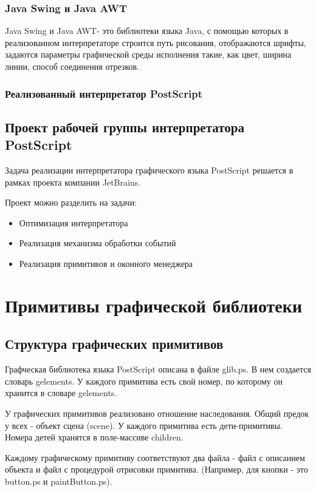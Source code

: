 \documentclass[14pt]{extarticle}
\begin{document}
		\subsubsection{Java Swing и Java AWT}
		Java Swing и Java AWT- это библиотеки языка Java, с помощью которых в реализованном интерпретаторе строится путь рисования, отображаются шрифты, задаются параметры графической среды исполнения такие, как цвет, ширина линии, способ соединения отрезков. 
		\subsubsection{ Реализованный интерпретатор PostScript }
		
		
	\subsection{ Проект рабочей группы интерпретатора PostScript }
Задача реализации интерпретатора графического языка PostScript решается в рамках проекта компании JetBrains. 
		
		Проект можно разделить на задачи:
		\begin{itemize}
		\item Оптимизация интерпретатора
		\item Реализация механизма обработки событий
		\item Реализация примитивов и оконного менеджера		
		\end{itemize}	
	
	\pagebreak
	\section{Примитивы графической библиотеки}
	\subsection{Структура графических примитивов}
		Графческая библиотека языка PostScript описана в файле  glib.ps. В нем создается словарь gelements. У каждого примитива есть свой номер, по которому он хранится в словаре gelements. 
		
		У графических примитивов реализовано отношение наследования. Общий предок у всех - объект сцена (scene). У каждого примитива есть дети-примитивы. Номера детей хранятся в поле-массиве children.
		
		Каждому графическому примитиву соответствуют два файла - файл с описанием объекта и файл с процедурой отрисовки примитива. (Например, для кнопки - это button.ps и paintButton.ps). 
		
\end{document}
